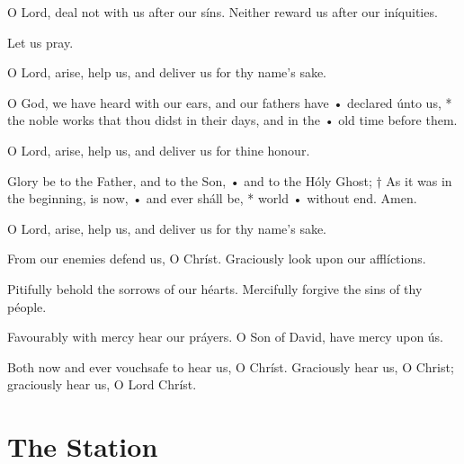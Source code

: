 \V O Lord, deal not with us after our síns.  \R Neither reward us after our iníquities.

\centerline{Let us pray.}

\medskip

\ant O Lord, arise, help us, and deliver us for thy name’s sake.

\V O God, we have heard with our ears, and our fathers have • declared únto us, * the noble works that thou didst in their days, and in the • old time before them.

\ant O Lord, arise, help us, and deliver us for thine honour.

\V Glory be to the Father, and to the Son, • and to the Hóly Ghost; † As it was in the beginning, is now, • and ever sháll be, * world • without end. Amen.

\ant O Lord, arise, help us, and deliver us for thy name’s sake.

\medskip


\V From our enemies defend us, O Chríst.  \R Graciously look upon our afflíctions.

\V Pitifully behold the sorrows of our héarts.  \R Mercifully forgive the sins of thy péople.

\V Favourably with mercy hear our práyers.  \R O Son of David, have mercy upon ús.

\V Both now and ever vouchsafe to hear us, O Chríst.  \R Graciously hear us, O Christ; graciously hear us, O Lord Chríst.


\section{The Station}
\label{litanyStation}

